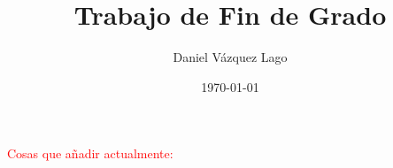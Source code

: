 \documentclass[12pt]{article}
\title{\textbf{\Huge Trabajo de Fin de Grado}}
\author{\Large Daniel Vázquez Lago}
\date{\today}
\begin{document}
\maketitle
\newpage
\tableofcontents
\newpage

\setlength{\parskip}{2.2mm} %


\begin{Anotacion}
\textcolor{red}{Cosas que añadir actualmente:}
\end{Anotacion}












\newpage
%

\printbibliography
{}
			
\end{document}
